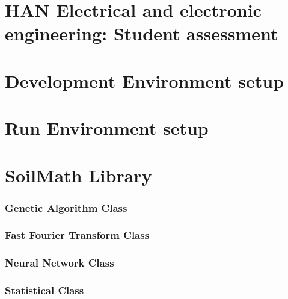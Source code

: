 \documentclass[11pt,fleqn,,a4paper,twoside,openright]{book}
\begin{document}
\chapter{HAN Electrical and electronic engineering: Student assessment}\label{HAN_assignement_Electrical}


\chapter{Development Environment setup}\label{SDE}

\chapter{Run Environment setup}\label{RE}


\chapter{SoilMath Library}
\subsection*{Genetic Algorithm Class}\label{app:GAclass}


\newpage
\subsection*{Fast Fourier Transform Class}\label{app:FFTclass}


\newpage
\subsection*{Neural Network Class}\label{app:NNClass}


\newpage
\subsection*{Statistical Class}\label{app:StatClass}


\newpage
\end{document}
